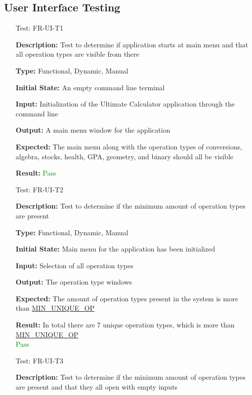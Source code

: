 \documentclass[12pt, titlepage]{article}
\begin{document}
\subsection{User Interface Testing}

\begin{enumerate}

\item[Test:]{FR-UI-T1\\}

\textbf{Description:} Test to determine if application starts at main menu and that all operation types are visible from there

\textbf{Type:} Functional, Dynamic, Manual
					
\textbf{Initial State:} An empty command line terminal
					
\textbf{Input:} Initialization of the Ultimate Calculator application through the command line
					
\textbf{Output:} A main menu window for the application

\textbf{Expected:} The main menu along with the operation types of conversions, algebra, stocks, health, GPA, geometry, and binary should all be visible

\textbf{Result:} \textcolor{Green}{Pass}

\item[Test:]{FR-UI-T2\\}

\textbf{Description:} Test to determine if the minimum amount of operation types are present

\textbf{Type:} Functional, Dynamic, Manual
					
\textbf{Initial State:} Main menu for the application has been initialized
					
\textbf{Input:} Selection of all operation types
					
\textbf{Output:} The operation type windows

\textbf{Expected:} The amount of operation types present in the system is more than \hyperref[sec:sp]{MIN\_UNIQUE\_OP}

\textbf{Result:} In total there are 7 unique operation types, which is more than \hyperref[sec:sp]{MIN\_UNIQUE\_OP}\\ \textcolor{Green}{Pass}

\item[Test:]{FR-UI-T3\\}

\textbf{Description:} Test to determine if the minimum amount of operation types are present and that they all open with empty inputs


\end{enumerate}
\end{document}
